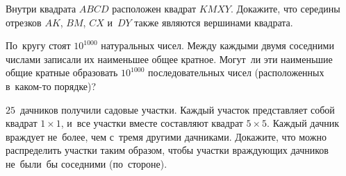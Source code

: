 \begin{problems}

\item
Внутри квадрата $ABCD$ расположен квадрат $KMXY$.
Докажите, что середины отрезков $AK$, $BM$, $CX$ и~$DY$ также являются
вершинами квадрата.

\item
По~кругу стоят $10^{1000}$ натуральных чисел.
Между каждыми двумя соседними числами записали их наименьшее общее кратное.
Могут~ли эти наименьшие общие кратные образовать $10^{1000}$ последовательных
чисел (расположенных в~каком-то порядке)?

\item
$25$~дачников получили садовые участки.
Каждый участок представляет собой квадрат $1 \times 1$, и~все участки вместе
составляют квадрат $5 \times 5$.
Каждый дачник враждует не~более, чем с~тремя другими дачниками.
Докажите, что можно распределить участки таким образом, чтобы участки
враждующих дачников не~были~бы соседними (по~стороне).

\end{problems}

